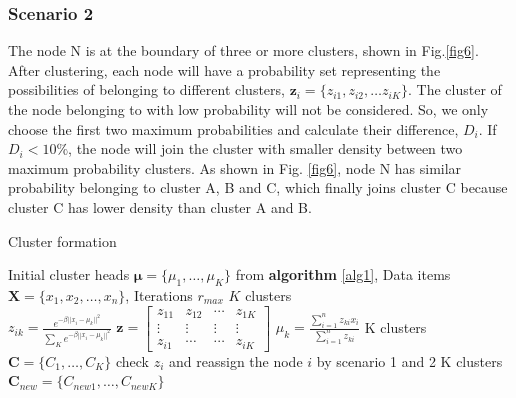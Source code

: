 \documentclass[journal,twoside,web]{ieeecolor}
\begin{document}
\subsubsection{Scenario 2}
The node N is at the boundary of three or more clusters, shown in Fig.\ref{fig6}. After clustering, each node will have a probability set representing the possibilities of belonging to different clusters, $\bm{z}_i = \{z_{i1},z_{i2}, \dots z_{iK} \}$. The cluster of the node belonging to with low probability will not be considered. So, we only choose the first two maximum probabilities and calculate their difference, $D_i$. If $ D_{i} < 10\%$, the node will join the cluster with smaller density between two maximum probability clusters. As shown in Fig. \ref{fig6}, node N has similar probability belonging to cluster A, B and C, which finally joins cluster C because cluster C has lower density than cluster A and B.
\begin{algorithm}
	\caption{Cluster formation}
	\label{alg2} 
	\begin{algorithmic}[1]
		\renewcommand{\algorithmicrequire}{\textbf{Input:}}
		\renewcommand{\algorithmicensure}{\textbf{Output:}}
		\REQUIRE Initial cluster heads $\bm{ \mu} = 
		\{\mu_1,\dots,\mu_K\}$ from \textbf{algorithm} \ref{alg1}, Data items $ \mathbf{X} = \{x_1,x_2,\dots,x_n\}$, Iterations $r_{max}$
		\ENSURE  $K$ clusters \\
				\STATE $z_{ik} = \frac{e^{-\beta||x_i-\mu_k||^2}}{\sum_{K}e^{-\beta||x_i-\mu_k||^2}}$
			\ENDFOR
			\STATE $\bm{z}={
				\left[ \begin{array}{cccc}
				z_{11} & z_{12} & \cdots & z_{1K}\\
				\vdots & \vdots & \vdots & \vdots\\
				z_{i1} & \cdots & \cdots & z_{iK}
				\end{array} 
				\right ]}$
				\STATE $\mu_k = \frac{\sum_{i=1}^{n}z_{ki}x_{i}}{\sum_{i=1}^{n}z_{ki}}$
			\ENDFOR
		\ENDFOR
		\STATE K clusters $\bm{C} = \{C_1,\dots,C_K\}$
			\STATE check $z_i$ and reassign the node $i$ by scenario 1 and 2
		\ENDFOR
		\RETURN K clusters $\bm{C}_{new} = \{C_{new1},\dots,C_{newK}\}$
	\end{algorithmic}
\end{algorithm}
\end{document}
